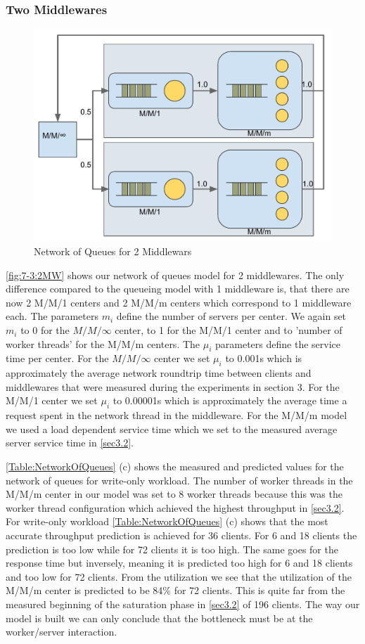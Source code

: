 \documentclass[11pt,a4paper]{article}
\begin{document}
\subsubsection{Two Middlewares}
\begin{figure}[H]
    \includegraphics[width=.5\linewidth]{plots/NetworkOfQueues2MW.pdf}
    \caption{Network of Queues for 2 Middlewars}
    \label{fig:7-3:2MW}
\end{figure}
\autoref{fig:7-3:2MW} shows our network of queues model for 2 middlewares. The only difference compared to the queueing model with 1 middleware is, that there are now 2 M/M/1 centers and 2 M/M/m centers which correspond to 1 middleware each. The parameters $m_i$ define the number of servers per center. We again set $m_i$ to 0 for the $M/M/\infty$ center, to 1 for the M/M/1 center and to 'number of worker threads' for the M/M/m centers.
The $\mu_i$ parameters define the service time per center. For the $M/M/\infty$ center we set $\mu_i$ to 0.001s which is approximately the average network roundtrip time between clients and middlewares that were measured during the experiments in section 3. For the M/M/1 center we set $\mu_i$ to 0.00001s which is approximately the average time a request spent in the network thread in the middleware.
For the M/M/m model we used a load dependent service time which we set to the measured average server service time in \autoref{sec3.2}.

\autoref{Table:NetworkOfQueues} (c) shows the measured and predicted values for the network of queues for write-only workload. The number of worker threads in the M/M/m center in our model was set to 8 worker threads because this was the worker thread configuration which achieved the highest throughput in \autoref{sec3.2}.
For write-only workload \autoref{Table:NetworkOfQueues} (c) shows that the most accurate throughput prediction is achieved for 36 clients. For 6 and 18 clients the prediction is too low while for 72 clients it is too high. The same goes for the response time but inversely, meaning it is predicted too high for 6 and 18 clients and too low for 72 clients.
From the utilization we see that the utilization of the M/M/m center is predicted to be 84\% for 72 clients. This is quite far from the measured beginning of the saturation phase in \autoref{sec3.2} of 196 clients. The way our model is built we can only conclude that the bottleneck must be at the worker/server interaction.
\end{document}

